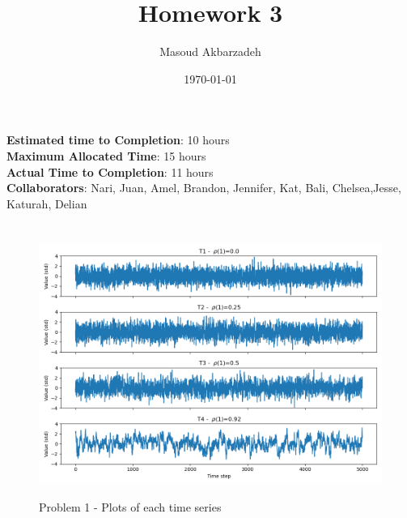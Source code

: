 \documentclass[12pt]{article}
\begin{document}
\title{Homework 3}
\author{Masoud Akbarzadeh}
\date{\today}

\maketitle
\begin{center}
    {\bf Estimated time to Completion}: {10 hours} \\
    {\bf Maximum Allocated Time}: {15 hours} \\
    {\bf Actual Time to Completion}: {11 hours} \\
    {\bf Collaborators}: {Nari, Juan, Amel, Brandon, Jennifer, Kat, Bali, Chelsea,Jesse, Katurah, Delian} \\

\end{center}

\section{}\label{sec:problem-1}
\subsection{}\label{subsec:problem-1-a}

\begin{figure}
\begin{center}
\includegraphics[width=6in]{p1_1_hw1_red_noise_time_series.png}
\caption{Problem 1 - Plots of each time series}{\label{fig:problem-1-a}}
\end{center}
\end{figure}
\end{document}
